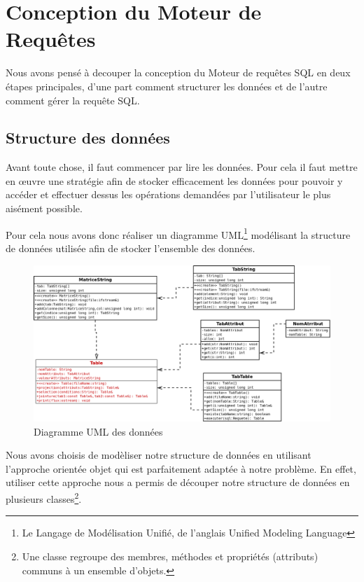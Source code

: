 \documentclass[oneside,13pt,a4paper]{report}
\begin{document}

\chapter{Conception du Moteur de Requêtes}

Nous avons pensé à decouper la conception du Moteur de requêtes SQL en deux étapes principales, d'une part comment structurer les données et de l'autre comment gérer la requête SQL.

\section{Structure des données}

Avant toute chose, il faut commencer par lire les données. Pour cela il faut mettre en \oe uvre une stratégie afin de stocker efficacement les données pour pouvoir
y accéder et effectuer dessus les opérations demandées par l’utilisateur le plus aisément possible.

Pour cela nous avons donc réaliser un diagramme UML\footnote{Le Langage de Modélisation Unifié, de l'anglais Unified Modeling Language} modélisant la structure de données utilisée afin de stocker  l’ensemble des données.

\vfill

\begin{figure}[h]
	\includegraphics[width=1\textwidth]{img/sql.png}\par
	\vspace{0.1cm}
	\caption{Diagramme UML des données}
	\label{uml-donnees}
\end{figure}

\pagebreak

Nous avons choisis de modèliser notre structure de données en utilisant l'approche orientée objet qui est parfaitement adaptée à notre problème. En effet,
utiliser cette approche nous a permis de découper notre structure de données en plusieurs classes\footnote{Une classe regroupe des membres, méthodes et propriétés (attributs) communs à un ensemble d'objets.}.
\end{document}
